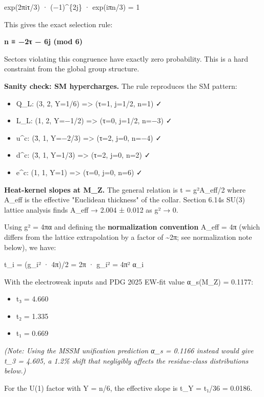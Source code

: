 exp(2πiτ/3) · (−1)\^{}\{2j\} · exp(iπn/3) = 1

This gives the exact selection rule:

\textbf{n ≡ −2τ − 6j (mod 6)}

Sectors violating this congruence have exactly zero probability. This is a hard constraint from the global group structure.

\textbf{Sanity check: SM hypercharges.} The rule reproduces the SM pattern:

\begin{itemize}
\tightlist
\item
  Q\_L: (3, 2, Y=1/6) =\textgreater{} (τ=1, j=1/2, n=1) ✓
\item
  L\_L: (1, 2, Y=−1/2) =\textgreater{} (τ=0, j=1/2, n=−3) ✓
\item
  u\^{}c: (\={3}, 1, Y=−2/3) =\textgreater{} (τ=2, j=0, n=−4) ✓
\item
  d\^{}c: (\={3}, 1, Y=1/3) =\textgreater{} (τ=2, j=0, n=2) ✓
\item
  e\^{}c: (1, 1, Y=1) =\textgreater{} (τ=0, j=0, n=6) ✓
\end{itemize}

\textbf{Heat-kernel slopes at M\_Z.} The general relation is t = g²A\_eff/2 where A\_eff is the effective "Euclidean thickness" of the collar. Section 6.14\textquotesingle s SU(3) lattice analysis finds A\_eff → 2.004 ± 0.012 as g² → 0.

Using g² = 4πα and defining the \textbf{normalization convention} A\_eff = 4π (which differs from the lattice extrapolation by a factor of \textasciitilde2π; see normalization note below), we have:

t\_i = (g\_i² · 4π)/2 = 2π · g\_i² = 4π² α\_i

With the electroweak inputs and PDG 2025 EW-fit value α\_s(M\_Z) = 0.1177:

\begin{itemize}
\tightlist
\item
  t₃ = 4.660
\item
  t₂ = 1.335
\item
  t₁ = 0.669
\end{itemize}

\emph{(Note: Using the MSSM unification prediction α\_s = 0.1166 instead would give t\_3 = 4.605, a 1.2\% shift that negligibly affects the residue-class distributions below.)}

For the U(1) factor with Y = n/6, the effective slope is t\_Y = t₁/36 = 0.0186.

